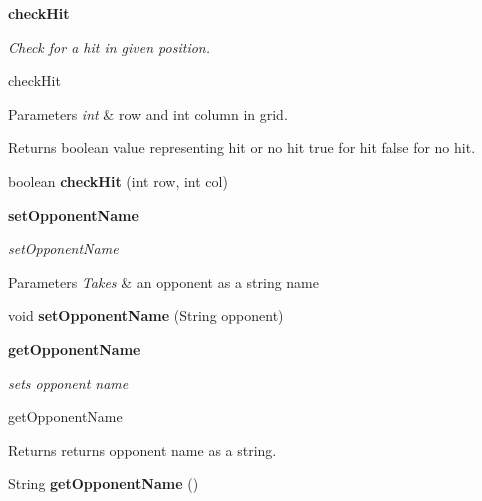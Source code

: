 \begin{Indent}{\bf check\+Hit}\par
{\em Check for a hit in given position.

check\+Hit


\begin{DoxyParams}{Parameters}
{\em int} & row and int column in grid. \\
\hline
\end{DoxyParams}
\begin{DoxyReturn}{Returns}
boolean value representing hit or no hit  true for hit false for no hit. 
\end{DoxyReturn}
}\begin{DoxyCompactItemize}
\item 
\hypertarget{classbattleship_1_1game_1_1Player_a0198edb748b456b64960fcc625d737ff}{}boolean {\bfseries check\+Hit} (int row, int col)\label{classbattleship_1_1game_1_1Player_a0198edb748b456b64960fcc625d737ff}

\end{DoxyCompactItemize}
\end{Indent}
\begin{Indent}{\bf set\+Opponent\+Name}\par
{\em set\+Opponent\+Name


\begin{DoxyParams}{Parameters}
{\em Takes} & an opponent as a string name \\
\hline
\end{DoxyParams}
}\begin{DoxyCompactItemize}
\item 
\hypertarget{classbattleship_1_1game_1_1Player_a78458e544e5917402c23caf61e5191b7}{}void {\bfseries set\+Opponent\+Name} (String opponent)\label{classbattleship_1_1game_1_1Player_a78458e544e5917402c23caf61e5191b7}

\end{DoxyCompactItemize}
\end{Indent}
\begin{Indent}{\bf get\+Opponent\+Name}\par
{\em sets opponent name

get\+Opponent\+Name

\begin{DoxyReturn}{Returns}
returns opponent name as a string. 
\end{DoxyReturn}
}\begin{DoxyCompactItemize}
\item 
\hypertarget{classbattleship_1_1game_1_1Player_a7a5ef3859695a6aaea85915ce20547e8}{}String {\bfseries get\+Opponent\+Name} ()\label{classbattleship_1_1game_1_1Player_a7a5ef3859695a6aaea85915ce20547e8}

\end{DoxyCompactItemize}
\end{Indent}
